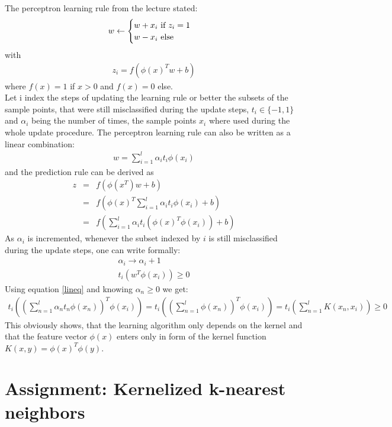 \documentclass{article}
\begin{document}
The perceptron learning rule from the lecture stated:
\begin{eqnarray}
w \leftarrow 
\begin{cases}
w + x_i $ if $ z_i  = 1 \\
w - x_i $ else$
\end{cases}
\end{eqnarray}
with
\begin{eqnarray}
z_i = f(\phi(x)^Tw +b)
\end{eqnarray}
where $f(x)=1$ if $x>0$ and $f(x)=0$ else.\\
Let i index the steps of updating the learning rule or better the subsets of the sample points, that were still misclassified during the update steps, $t_i \in \{-1,1\}$ and $\alpha_i$ being the number of times, the sample points $x_i$ where used during the whole update procedure. The perceptron learning rule can also be written as a linear combination:
\begin{eqnarray}
w = \sum_{i=1}^{l} \alpha_i t_i \phi(x_i)
\label{lineq}
\end{eqnarray}
and the prediction rule can be derived as 
\begin{eqnarray}
z &=& f(\phi(x^T) w+b)\\
&=& f(\phi(x)^T \sum_{i=1}^{l} \alpha_i t_i \phi(x_i) +b)\\
&=& f(\sum_{i=1}^{l} \alpha_i t_i (\phi(x)^T \phi(x_i)) +b)
\end{eqnarray}
As $\alpha_i$ is incremented, whenever the subset indexed by $i$ is still misclassified during the update steps, one can write formally:
\begin{eqnarray}
\alpha_i \rightarrow \alpha_i +1\\
t_i (w^T \phi(x_i)) \geq 0 
\end{eqnarray}
Using equation \ref{lineq} and knowing $\alpha_n \geq 0$ we get:
\begin{eqnarray}
t_i \left( \left( \sum_{n=1}^{l} \alpha_n t_n \phi(x_n)\right)^T \phi(x_i) \right) = 
t_i \left( \left( \sum_{n=1}^{l} \phi(x_n)\right)^T \phi(x_i)\right) =
t_i\left(\sum_{n=1}^{l} K(x_n,x_i)\right) \geq 0 
\end{eqnarray}
This obviously shows, that the learning algorithm only depends on the kernel and that the feature vector $\phi(x)$ enters only in form of the kernel function $K(x,y) = \phi(x)^T\phi(y)$.


\section{Assignment: Kernelized k-nearest neighbors}
\end{document}
